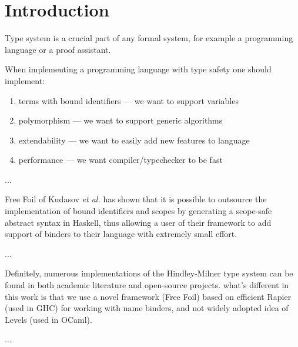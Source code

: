 \chapter{Introduction}
\label{chap:intro}


Type system is a crucial part of any formal system, for example a programming language or a proof assistant.

When implementing a programming language with type safety one should implement:
\begin{enumerate}
  \item terms with bound identifiers — we want to support variables
  \item polymorphism — we want to support generic algorithms
  \item extendability — we want to easily add new features to language
  \item performance — we want compiler/typechecker to be fast
\end{enumerate}

...

Free Foil of Kudasov \textit{et al.} \cite{FreeFoil} has shown that it is possible to outsource the implementation of bound identifiers and scopes by generating a scope-safe abstract syntax in Haskell, thus allowing a user of their framework to add support of binders to their language with extremely small effort.

...

Definitely, numerous implementations of the Hindley-Milner type system can be found in both academic literature and open-source projects. what's different in this work is that we use a novel framework (Free Foil) based on efficient Rapier (used in GHC) for working with name binders, and not widely adopted idea of Levels (used in OCaml).

...
